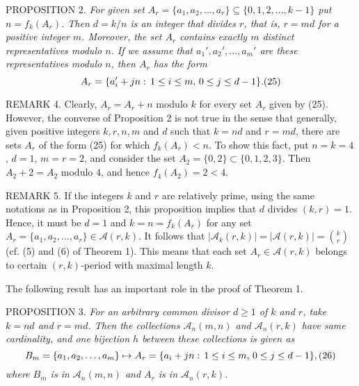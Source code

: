\documentclass[12pt]{amsart}
\begin{document}
{\vspace{2mm} 
P{\scriptsize ROPOSITION} 2.
{\it For given set 
$A_r=\{a_1,a_2,\ldots,a_r\}\subseteq \{0,1,2,\ldots,k-1\}$  put $n=f_k(A_r)$.
Then $d=k/n$ is an integer that divides $r$, that is, $r=md$ for a positive 
integer $m$. 
Moreover, 
the set $A_r$ contains exactly $m$ distinct representatives modulo
$n$. If we assume that $a_1',a_2',\ldots,a_m'$ are these representatives 
modulo $n$, then $A_r$ has the form} 
$$
A_r=\{a'_i +jn:\, 1\le i\le m,\, 0\le j\le d-1\}.\relax(25)
 $$

\vspace{2mm}

R{\scriptsize EMARK} 4. Clearly, $A_r=A_r+n$ modulo $k$
for every set $A_r$ given by (25). However, the converse of Proposition 2 
is not true in the sense that  generally, given positive integers $k,r,n,m$ 
and $d$ such that $k=nd$ and $r=md$, there are sets $A_r$ of the form
(25) for which $f_k(A_r)<n$. To show this fact, put $n=k=4$, $d=1$, $m=r=2$,
 and consider the set $A_2=\{0,2\}\subset \{0,1,2,3\}$.
Then $A_2+2=A_2$ modulo $4$, and hence $f_4(A_2)=2<4$.

\vspace{2mm}
R{\scriptsize EMARK} 5.
If the integers $k$ and $r$ are relatively prime,
using the same notations as in Proposition 2, 
this proposition implies that $d$ divides $(k,r)=1$. Hence, it must be
$d=1$ and $k=n=f_k(A_r)$ for any set $A_r=\{a_1,a_2,\ldots,a_r\}\in 
{\mathcal A}(r,k)$. It follows that  $\left|{\mathcal A}_k(r,k)\right|
=\left|{\mathcal A}(r,k)\right|={k\choose r}$
(cf. (5) and (6) of Theorem 1). This means 
that  each set $A_r\in {\mathcal A}(r,k)$   belongs
to  certain  $(r,k)$-period with maximal length  $k$.
  

\vspace{2mm}
The following result has an important role in the proof of Theorem 1. 

 
\vspace*{2mm}

P{\scriptsize ROPOSITION} 3.
 {\it
For  an arbitrary common divisor $d\ge 1$
of $k$ and $r$, take $k=nd$ and $r=md$.
Then the collections ${\mathcal A}_n(m,n)$ and ${\mathcal A}_n(r,k)$ have same 
cardinality, and one bijection $h$ between these collections is given as}
   $$
B_m=\{a_1,a_2,\ldots,a_m\}\mapsto A_r=\{a_i+jn:\, 1\le i\le m,\, 
0\le j\le d-1\},\relax(26)
  $$
{\it where $B_m$ is in ${\mathcal A}_n(m,n)$
and $A_r$ is in ${\mathcal A}_n(r,k)$.}


\vspace{2mm}

}
\end{document}
